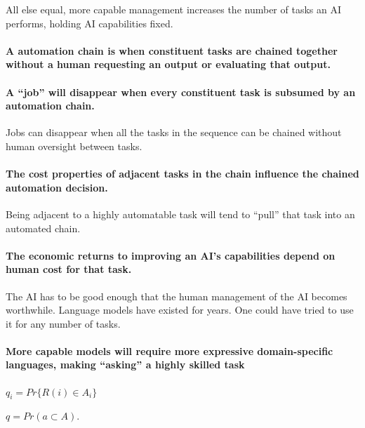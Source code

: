 \documentclass{article}
\begin{document}
All else equal, more capable management increases the number of tasks an AI performs, holding AI capabilities fixed. 

\paragraph{A automation chain is when constituent tasks are chained together without a human requesting an output or evaluating that output.}

\paragraph{A ``job'' will disappear when every constituent task is subsumed by an automation chain.}
Jobs can disappear when all the tasks in the sequence can be chained without human oversight between tasks. 

\paragraph{The cost properties of adjacent tasks in the chain influence the chained automation decision.}
Being adjacent to a highly automatable task will tend to ``pull'' that task into an automated chain.

\paragraph{The economic returns to improving an AI's capabilities depend on human cost for that task.}
The AI has to be good enough that the human management of the AI becomes worthwhile. 
Language models have existed for years.
One could have tried to use it for any number of tasks. 

\paragraph{More capable models will require more expressive domain-specific languages, making ``asking'' a highly skilled task}
$q_i = Pr\{R(i) \in A_i\}$

$q = Pr(a \subset A)$.
\end{document}
